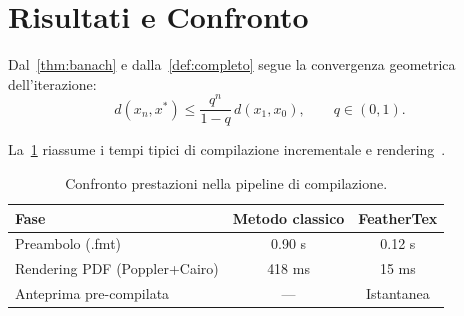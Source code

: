\section{Risultati e Confronto}\label{sec:results}

Dal~\cref{thm:banach} e dalla~\cref{def:completo} segue la convergenza geometrica dell'iterazione:
\begin{equation}\label{eq:conv}
  d(x_n, x^*) \le \frac{q^n}{1 - q}\, d(x_1, x_0), \qquad q \in (0, 1).
\end{equation}

La~\cref{tab:bench} riassume i tempi tipici di compilazione incrementale e rendering~\cite{vaswani2017}.

\begin{table}[htbp]
  \centering
  \begin{tabular}{lcc}
    \toprule
    \textbf{Fase} & \textbf{Metodo classico} & \textbf{FeatherTex} \\
    \midrule
    Preambolo (.fmt) & 0.90 s & 0.12 s \\
    Rendering PDF (Poppler+Cairo) & 418 ms & 15 ms \\
    Anteprima pre-compilata & --- & Istantanea \\
    \bottomrule
  \end{tabular}
  \caption{Confronto prestazioni nella pipeline di compilazione.}
  \label{tab:bench}
\end{table}

